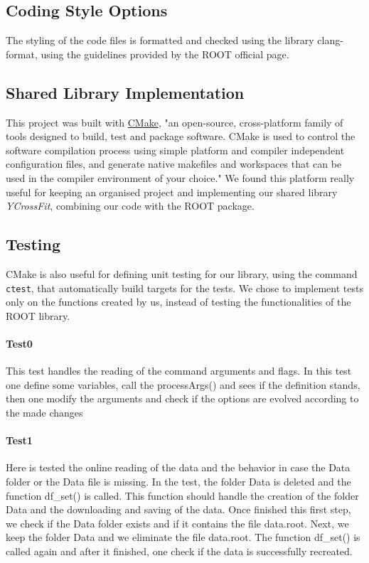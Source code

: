\documentclass[a4paper,11pt]{article}
\begin{document}
\subsection{Coding Style Options}
The styling of the code files is formatted and checked using the library clang-format, using the guidelines provided by the ROOT official page.

\subsection{Shared Library Implementation}
This project was built with \href{https://cmake.org}{CMake}, "an open-source, cross-platform family of tools designed to build, test and package software. CMake is used to control the software compilation process using simple platform and compiler independent configuration files, and generate native makefiles and workspaces that can be used in the compiler environment of your choice."
We found this platform really useful for keeping an organised project and implementing our shared library \textit{YCrossFit}, combining our code with the ROOT package.

\subsection{Testing}
CMake is also useful for defining unit testing for our library, using the command \texttt{ctest}, that automatically build targets for the tests. 
We chose to implement tests only on the functions created by us, instead of testing the functionalities of the ROOT library.

\paragraph{Test0} This test handles the reading of the command arguments and flags. In this test one define some variables, call the processArgs() and sees if the definition stands, then one modify the arguments and check if the options are evolved according to the made changes

\paragraph{Test1} Here is tested the online reading of the data and the behavior in case the Data folder or the Data file is missing. In the test, the folder Data is deleted and the function df\_set() is called. This function should handle the creation of the folder Data and the downloading and saving of the data. Once finished this first step, we check if the Data folder exists and if it contains the file data.root. Next, we keep the folder Data and we eliminate the file data.root. The function df\_set() is called again and after it finished, one check if the data is successfully recreated.
\end{document}
